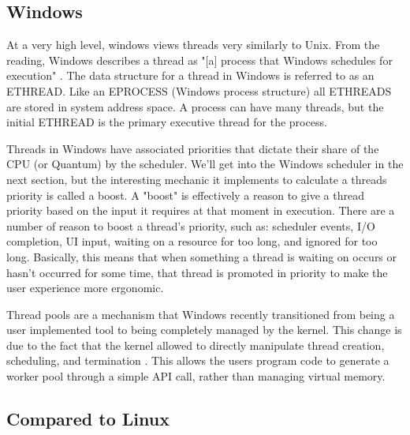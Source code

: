 \documentclass[10pt,draftclsnofoot,onecolumn]{IEEEtran}
\begin{document}
\subsection{Windows}
\label{sub:Thread Windows}

\par At a very high level, windows views threads very similarly to Unix.
From the reading, Windows describes a thread as "[a] process that Windows schedules for execution" \cite{win:1}.
The data structure for a thread in Windows is referred to as an ETHREAD.
Like an EPROCESS (Windows process structure) all ETHREADS are stored in system address space.
A process can have many threads, but the initial ETHREAD is the primary executive thread for the process.

\par Threads in Windows have associated priorities that dictate their share of the CPU (or Quantum) by the scheduler.
We'll get into the Windows scheduler in the next section, but the interesting mechanic it implements to calculate a threads priority is called a boost.
A "boost" is effectively a reason to give a thread priority based on the input it requires at that moment in execution.
There are a number of reason to boost a thread's priority, such as: scheduler events, I/O completion, UI input, waiting on a resource for too long, and ignored for too long.
Basically, this means that when something a thread is waiting on occurs or hasn't occurred for some time, that thread is promoted in priority to make the user experience more ergonomic.

\par Thread pools are a mechanism that Windows recently transitioned from being a user implemented tool to being completely managed by the kernel.
This change is due to the fact that the kernel allowed to directly manipulate thread creation, scheduling, and termination \cite{win:1}.
This allows the users program code to generate a worker pool through a simple API call, rather than managing virtual memory.

\subsection{Compared to Linux}
\label{sub:Process Linux}
\end{document}

